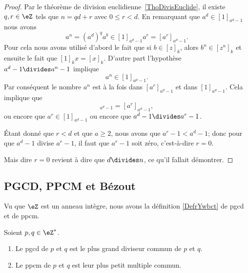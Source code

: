 \begin{proof}
    Par le théorème de division euclidienne~\ref{ThoDivisEuclide}, il existe \( q,r\in \eZ\) tels que \( n = qd+r\) avec \( 0\leq r<d\). En remarquant que \( a^d\in[1]_{a^d-1}\) nous avons
    \begin{equation}
        a^n=(a^d)^qa^b\in[1]_{a^d-1}a^r=[a^r]_{a^d-1}.
    \end{equation}
    Pour cela nous avons utilisé d'abord le fait que si \( b\in [z]_k\), alors \( b^n\in[z^n]_k\) et ensuite le fait que \( [1]_kx=[x]_k\). D'autre part l'hypothèse \( a^d-1\divides a^n-1\) implique
    \begin{equation}
        a^n\in[1]_{a^d-1}.
    \end{equation}
    Par conséquent le nombre \( a^n\) est à la fois dans \( [a^r]_{a^d-1}\) et dans \( [1]_{a^d-1}\). Cela implique que
    \begin{equation}
        [1]_{a^d-1}=[a^r]_{a^d-1},
    \end{equation}
    ou encore que \( a^r\in[1]_{a^d-1}\) ou encore que \( a^d-1\divides a^r-1\).

    Étant donné que \( r<d\) et que \( a\geq 2\), nous avons que \( a^r-1<a^d-1\); donc pour que \( a^d-1\) divise \( a^r-1\), il faut que \( a^r-1\) soit zéro, c'est-à-dire \( r=0\).

    Mais dire \( r=0\) revient à dire que \( d\divides n\), ce qu'il fallait démontrer.
\end{proof}

\subsection{PGCD, PPCM et Bézout}

Vu que \( \eZ\) est un anneau intègre, nous avons la définition \ref{DefrYwbct} de pgcd et de ppcm.
\begin{proposition}       \label{PROPooAVRGooUfhjwF}
    Soient \( p,q\in\eZ^*\). 
    \begin{enumerate}
        \item
            Le pgcd de \( p\) et \( q\) est le plus grand diviseur commun de \( p\) et \( q\). 
        \item
            Le ppcm de \( p\) et \( q\) est leur plus petit multiple commun.
    \end{enumerate}
\end{proposition}


